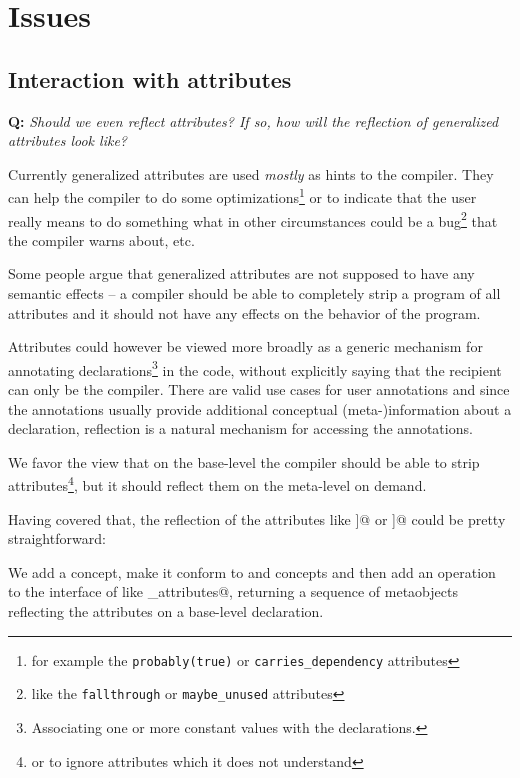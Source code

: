 \section{Issues}

\subsection{Interaction with attributes}

\textbf{Q:} {\em Should we even reflect attributes? If so, how will the reflection
of generalized attributes look like?}

Currently generalized attributes are used {\em mostly} as hints to the compiler.
They can help the compiler to do some optimizations\footnote{for example the
\texttt{probably(true)} or \texttt{carries\_dependency} attributes} or to
indicate that the user really means to do something what in other circumstances
could be a bug\footnote{like the \texttt{fallthrough} or \texttt{maybe\_unused}
attributes} that the compiler warns about, etc.

Some people argue that generalized attributes are not supposed to have any
semantic effects -- a compiler should be able to completely strip 
a program of all attributes and it should not have any effects on the behavior
of the program.

Attributes could however be viewed more broadly as a generic mechanism for
annotating declarations\footnote{Associating one or more constant values with
the declarations.} in the code, without explicitly saying that the recipient
can only be the compiler.
There are valid use cases for user annotations and since the annotations
usually provide additional conceptual (meta-)information about a declaration,
reflection is a natural mechanism for accessing the annotations.

We favor the view that on the base-level the compiler should be able to
strip attributes\footnote{or to ignore attributes which it does not understand},
but it should reflect them on the meta-level on demand.

Having covered that, the reflection of the  attributes like
\verb@[[attr1]]@ or \verb@[[namespace::attr2]]@ could be pretty straightforward:

We add a  concept,
make it conform to  and  concepts and then add an
operation to the interface of  like \verb@get_attributes@, returning
a sequence of metaobjects reflecting the attributes on a base-level declaration.

